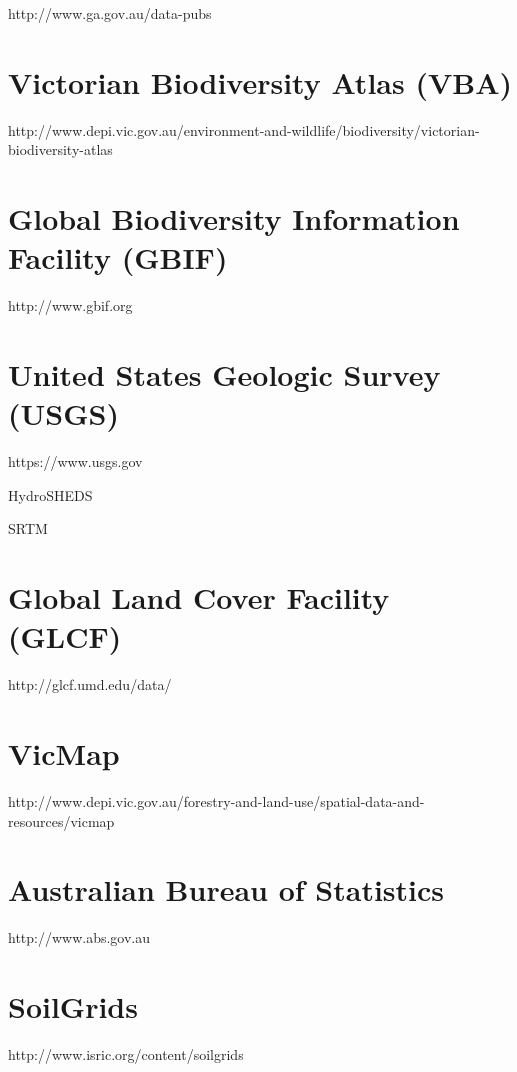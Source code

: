 http://www.ga.gov.au/data-pubs

\section{Victorian Biodiversity Atlas (VBA)}

http://www.depi.vic.gov.au/environment-and-wildlife/biodiversity/victorian-biodiversity-atlas

\section{Global Biodiversity Information Facility (GBIF)}

http://www.gbif.org

\section{United States Geologic Survey (USGS)}

https://www.usgs.gov

HydroSHEDS

SRTM

\section{Global Land Cover Facility (GLCF)}

http://glcf.umd.edu/data/

\section{VicMap}

http://www.depi.vic.gov.au/forestry-and-land-use/spatial-data-and-resources/vicmap

\section{Australian Bureau of Statistics}

http://www.abs.gov.au

\section{SoilGrids}

http://www.isric.org/content/soilgrids
